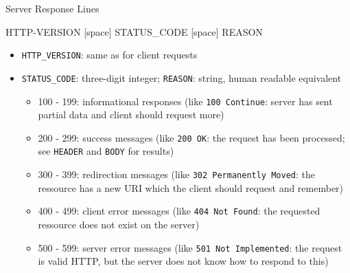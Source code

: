 \begin{frame}{Server Response Lines}
%
\vspace{-9pt}
\begin{codebox}
\ttfamily
HTTP-VERSION [space] STATUS\_CODE [space] REASON
\end{codebox}
%
\vspace{-6pt}
\begin{itemize}
\item \texttt{HTTP\_VERSION}: same as for client requests
\pause
\item \texttt{STATUS\_CODE}: three-digit integer; \texttt{REASON}: string, human readable equivalent
	\begin{itemize}
	\item 100 - 199: informational responses (like \texttt{100 Continue}: server has sent partial data and client should request more)
	\item 200 - 299: success messages (like \texttt{200 OK}: the request has been processed; see \texttt{HEADER} and \texttt{BODY} for results)
	\item 300 - 399: redirection messages (like \texttt{302 Permanently Moved}: the ressource has a new URI which the client should request and remember)
	\item 400 - 499: client error messages (like \texttt{404 Not Found}: the requested ressource does not exist on the server)
	\item 500 - 599: server error messages (like \texttt{501 Not Implemented}: the request is valid HTTP, but the server does not know how to respond to this)
	\end{itemize}
\end{itemize}
%
\end{frame}


